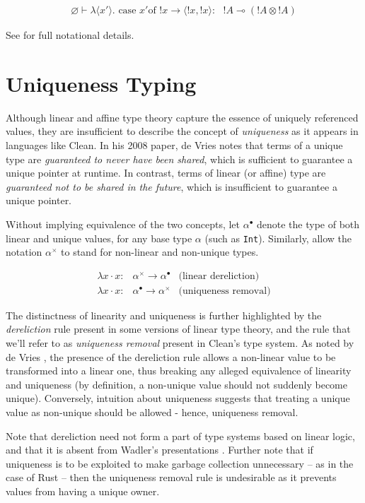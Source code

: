 \documentclass[]{unswthesis}
\newcommand{\case}{\text{ case }}
\newcommand{\of}{\text{of }}
\newcommand{\yields}{\multimap}
\begin{document}
\begin{eqnarray*}
\varnothing \vdash \lambda \langle x' \rangle . \case x' \of !x \rightarrow \langle !x, !x\rangle :\text{ } !A \yields (!A \otimes !A)
\end{eqnarray*}

See \cite{wadler93} for full notational details.

\section{Uniqueness Typing}

Although linear and affine type theory capture the essence of uniquely referenced values, they are insufficient to describe the concept of \textit{uniqueness} as it appears in languages like Clean. In his 2008 paper, de Vries \cite{deVries08} notes that terms of a unique type are \textit{guaranteed to never have been shared}, which is sufficient to guarantee a unique pointer at runtime. In contrast, terms of linear (or affine) type are \textit{guaranteed not to be shared in the future}, which is insufficient to guarantee a unique pointer.

Without implying equivalence of the two concepts, let $\alpha^\bullet$ denote the type of both linear and unique values, for any base type $\alpha$ (such as \texttt{Int}). Similarly, allow the notation $\alpha^\times$ to stand for non-linear and non-unique types.

\begin{eqnarray*}
\lambda x \cdot x : & \alpha^\times \rightarrow \alpha^\bullet & \text{(linear dereliction)}\\
\lambda x \cdot x : & \alpha^\bullet \rightarrow \alpha^\times & \text{(uniqueness removal)}
\end{eqnarray*}

The distinctness of linearity and uniqueness is further highlighted by the \textit{dereliction} rule present in some versions of linear type theory, and the rule that we'll refer to as \textit{uniqueness removal} present in Clean's type system. As noted by de Vries \cite{deVriesPhD08}, the presence of the dereliction rule allows a non-linear value to be transformed into a linear one, thus breaking any alleged equivalence of linearity and uniqueness (by definition, a non-unique value should not suddenly become unique). Conversely, intuition about uniqueness suggests that treating a unique value as non-unique should be allowed - hence, uniqueness removal.

Note that dereliction need not form a part of type systems based on linear logic, and that it is absent from Wadler's presentations \cite{wadler90, wadler93}. Further note that if uniqueness is to be exploited to make garbage collection unnecessary -- as in the case of Rust -- then the uniqueness removal rule is undesirable as it prevents values from having a unique owner.
\end{document}
